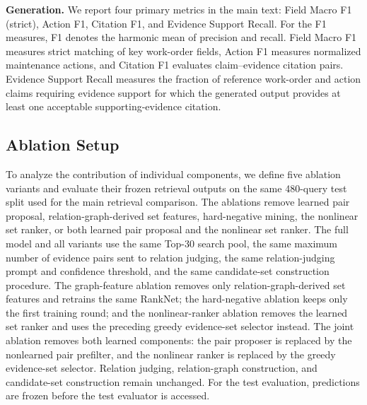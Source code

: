\textbf{Generation.}
We report four primary metrics in the main text: Field Macro F1 (strict), Action F1, Citation F1, and Evidence Support Recall. For the F1 measures, F1 denotes the harmonic mean of precision and recall. Field Macro F1 measures strict matching of key work-order fields, Action F1 measures normalized maintenance actions, and Citation F1 evaluates claim--evidence citation pairs. Evidence Support Recall measures the fraction of reference work-order and action claims requiring evidence support for which the generated output provides at least one acceptable supporting-evidence citation.

\subsection{Ablation Setup}

To analyze the contribution of individual components, we define five ablation variants and evaluate their frozen retrieval outputs on the same 480-query test split used for the main retrieval comparison. The ablations remove learned pair proposal, relation-graph-derived set features, hard-negative mining, the nonlinear set ranker, or both learned pair proposal and the nonlinear set ranker. The full model and all variants use the same Top-30 search pool, the same maximum number of evidence pairs sent to relation judging, the same relation-judging prompt and confidence threshold, and the same candidate-set construction procedure. The graph-feature ablation removes only relation-graph-derived set features and retrains the same RankNet; the hard-negative ablation keeps only the first training round; and the nonlinear-ranker ablation removes the learned set ranker and uses the preceding greedy evidence-set selector instead. The joint ablation removes both learned components: the pair proposer is replaced by the nonlearned pair prefilter, and the nonlinear ranker is replaced by the greedy evidence-set selector. Relation judging, relation-graph construction, and candidate-set construction remain unchanged. For the test evaluation, predictions are frozen before the test evaluator is accessed.
